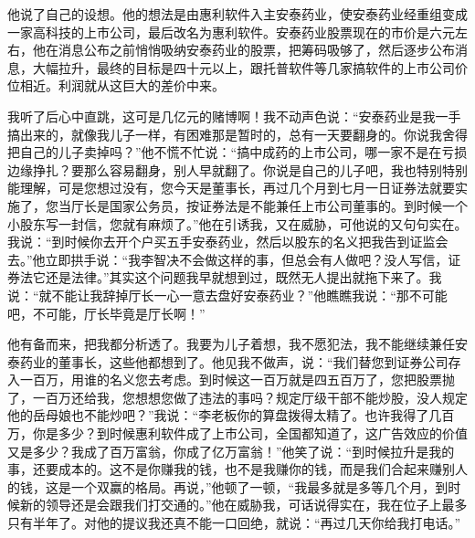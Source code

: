 \documentclass[12pt,oneside]{book}
\begin{document}
他说了自己的设想。他的想法是由惠利软件入主安泰药业，使安泰药业经重组变成一家高科技的上市公司，最后改名为惠利软件。安泰药业股票现在的市价是六元左右，他在消息公布之前悄悄吸纳安泰药业的股票，把筹码吸够了，然后逐步公布消息，大幅拉升，最终的目标是四十元以上，跟托普软件等几家搞软件的上市公司价位相近。利润就从这巨大的差价中来。

我听了后心中直跳，这可是几亿元的赌博啊！我不动声色说：``安泰药业是我一手搞出来的，就像我儿子一样，有困难那是暂时的，总有一天要翻身的。你说我舍得把自己的儿子卖掉吗？''他不慌不忙说：``搞中成药的上市公司，哪一家不是在亏损边缘挣扎？要那么容易翻身，别人早就翻了。你说是自己的儿子吧，我也特别特别能理解，可是您想过没有，您今天是董事长，再过几个月到七月一日证券法就要实施了，您当厅长是国家公务员，按证券法是不能兼任上市公司董事的。到时候一个小股东写一封信，您就有麻烦了。''他在引诱我，又在威胁，可他说的又句句实在。我说：``到时候你去开个户买五手安泰药业，然后以股东的名义把我告到证监会去。''他立即拱手说：``我李智决不会做这样的事，但总会有人做吧？没人写信，证券法它还是法律。''其实这个问题我早就想到过，既然无人提出就拖下来了。我说：``就不能让我辞掉厅长一心一意去盘好安泰药业？''他瞧瞧我说：``那不可能吧，不可能，厅长毕竟是厅长啊！''

他有备而来，把我都分析透了。我要为儿子着想，我不愿犯法，我不能继续兼任安泰药业的董事长，这些他都想到了。他见我不做声，说：``我们替您到证券公司存入一百万，用谁的名义您去考虑。到时候这一百万就是四五百万了，您把股票抛了，一百万还给我，您想想您做了违法的事吗？规定厅级干部不能炒股，没人规定他的岳母娘也不能炒吧？''我说：``李老板你的算盘拨得太精了。也许我得了几百万，你是多少？到时候惠利软件成了上市公司，全国都知道了，这广告效应的价值又是多少？我成了百万富翁，你成了亿万富翁！''他笑了说：``到时候拉升是我的事，还要成本的。这不是你赚我的钱，也不是我赚你的钱，而是我们合起来赚别人的钱，这是一个双赢的格局。再说，''他顿了一顿，``我最多就是多等几个月，到时候新的领导还是会跟我们打交通的。''他在威胁我，可话说得实在，我在位子上最多只有半年了。对他的提议我还真不能一口回绝，就说：``再过几天你给我打电话。''
\end{document}
